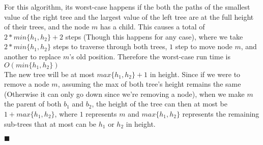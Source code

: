 \documentclass[20pt]{article}
\begin{document}
\noindent
\begin{text}
    For this algorithm, its worst-case happens if the both the paths of the smallest value of the right tree and the largest value of the left tree are at the full height of their trees, and the node $m$ has a child. This causes a total of $2*min\{h_1, h_2\} + 2$ steps (Though this happens for any case), where we take $2*min\{h_1, h_2\}$ steps to traverse through both trees, $1$ step to move node $m$, and another to replace $m$'s old position. Therefore the worst-case run time is $O(min\{h_1,h_2\})$\\
    
    \noindent
    The new tree will be at most $max\{h_1, h_2\} + 1$ in height. Since if we were to remove a node $m$, assuming the max of both tree's height remains the same (Otherwise it can only go down since we're removing a node), when we make $m$ the parent of both $b_1$ and $b_2$, the height of the tree can then at most be $1 + max\{h_1, h_2\}$, where $1$ represents $m$ and $max\{h_1, h_2\}$ represents the remaining sub-trees that at most can be $h_1$ or $h_2$ in height.
    
    \hfill $\blacksquare$
\end{text}

\end{document}
